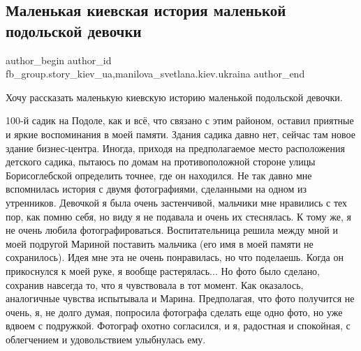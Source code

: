  
 
 
 
 
 
\subsection{Маленькая киевская история маленькой подольской девочки}
\label{sec:20_11_2021.fb.fb_group.story_kiev_ua.2.malenkaja_podolskaja_devochka}
 
\ifcmt
 author_begin
   author_id fb_group.story_kiev_ua,manilova_svetlana.kiev.ukraina
 author_end
\fi

Хочу рассказать маленькую киевскую историю маленькой подольской девочки. 

100-й садик на Подоле, как и всё, что связано с этим районом, оставил приятные
и яркие воспоминания в моей памяти. Здания садика давно нет, сейчас там новое
здание бизнес-центра. Иногда, приходя на предполагаемое место расположения
детского садика, пытаюсь по домам на противоположной стороне улицы
Борисоглебской определить точнее, где он находился. Не так давно мне
вспомнилась история с двумя фотографиями, сделанными на одном из утренников.
Девочкой я была очень застенчивой, мальчики мне нравились с тех пор, как помню
себя, но виду я не подавала и очень их стеснялась. К тому же, я не очень любила
фотографироваться. Воспитательница решила между мной и моей подругой Мариной
поставить мальчика (его имя в моей памяти не сохранилось). Идея мне эта не
очень понравилась, но что поделаешь. Когда он прикоснулся к моей руке, я вообще
растерялась... Но фото было сделано, сохранив навсегда то, что я чувствовала в
тот момент. Как оказалось, аналогичные чувства испытывала и Марина.
Предполагая, что фото получится не очень, я, не долго думая, попросила
фотографа сделать еще одно фото, но уже вдвоем с подружкой. Фотограф охотно
согласился, и я, радостная и спокойная, с облегчением и удовольствием
улыбнулась ему. 

\begin{multicols}{2}


\end{multicols}

